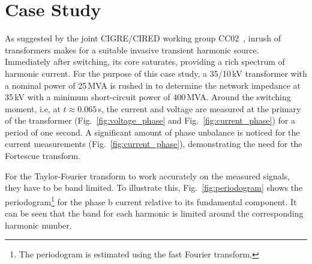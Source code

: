 \section{Case Study}
\label{sec:case_study}

As suggested by the joint CIGRE/CIRED working group CC02~\cite{robert_1997}, inrush of transformers makes for a suitable invasive transient harmonic source. Immediately after switching, its core saturates, providing a rich spectrum of harmonic current. For the purpose of this case study, a 35/10\,kV transformer with a nominal power of 25\,MVA is rushed in to determine the network impedance at 35\,kV with a minimum short-circuit power of 400\,MVA. Around the switching moment, i.e, at $t\approx0.065$\,s, the current and voltage are measured at the primary of the transformer (Fig.~\ref{fig:voltage_phase} and Fig.~\ref{fig:current_phase}) for a period of one second. A significant amount of phase unbalance is noticed for the current measurements (Fig.~\ref{fig:current_phase}), demonstrating the need for the Fortescue transform. 

For the Taylor-Fourier transform to work accurately on the measured signals, they have to be band limited. To illustrate this, Fig.~\ref{fig:periodogram} shows the periodogram\footnote{The periodogram is estimated using the fast Fourier transform.} for the phase b current relative to its fundamental component. It can be seen that the band for each harmonic is limited around the corresponding harmonic number.  

